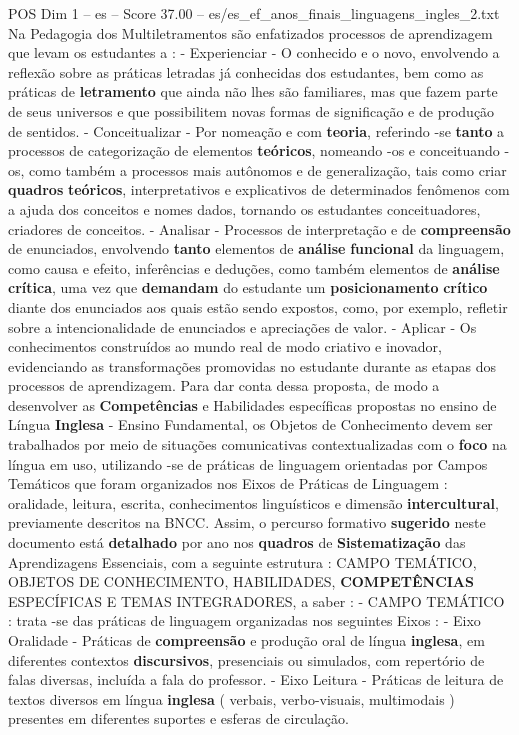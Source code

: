 \begin{textsample}{POS Dim 1 – es – Score 37.00 – es/es\_ef\_anos\_finais\_linguagens\_ingles\_2.txt}  \label{ex:f1_pos_200}
Na Pedagogia dos Multiletramentos são enfatizados processos de aprendizagem que levam os estudantes a : - Experienciar - O conhecido e o novo, envolvendo a reflexão sobre as práticas letradas já conhecidas dos estudantes, bem como as práticas de \textbf{letramento} que ainda não lhes são familiares, mas que fazem parte de seus universos e que possibilitem novas formas de significação e de produção de sentidos. - Conceitualizar - Por nomeação e com \textbf{teoria}, referindo -se \textbf{tanto} a processos de categorização de elementos \textbf{teóricos}, nomeando -os e conceituando -os, como também a processos mais autônomos e de generalização, tais como criar \textbf{quadros} \textbf{teóricos}, interpretativos e explicativos de determinados fenômenos com a ajuda dos conceitos e nomes dados, tornando os estudantes conceituadores, criadores de conceitos. - Analisar - Processos de interpretação e de \textbf{compreensão} de enunciados, envolvendo \textbf{tanto} elementos de \textbf{análise} \textbf{funcional} da linguagem, como causa e efeito, inferências e deduções, como também elementos de \textbf{análise} \textbf{crítica}, uma vez que \textbf{demandam} do estudante um \textbf{posicionamento} \textbf{crítico} diante dos enunciados aos quais estão sendo expostos, como, por exemplo, refletir sobre a intencionalidade de enunciados e apreciações de valor. - Aplicar - Os conhecimentos construídos ao mundo real de modo criativo e inovador, evidenciando as transformações promovidas no estudante durante as etapas dos processos de aprendizagem.
Para dar conta dessa proposta, de modo a desenvolver as \textbf{Competências} e Habilidades específicas propostas no ensino de Língua \textbf{Inglesa} - Ensino Fundamental, os Objetos de Conhecimento devem ser trabalhados por meio de situações comunicativas contextualizadas com o \textbf{foco} na língua em uso, utilizando -se de práticas de linguagem orientadas por Campos Temáticos que foram organizados nos Eixos de Práticas de Linguagem : oralidade, leitura, escrita, conhecimentos linguísticos e dimensão \textbf{intercultural}, previamente descritos na BNCC.
Assim, o percurso formativo \textbf{sugerido} neste documento está \textbf{detalhado} por ano nos \textbf{quadros} de \textbf{Sistematização} das Aprendizagens Essenciais, com a seguinte estrutura : CAMPO TEMÁTICO, OBJETOS DE CONHECIMENTO, HABILIDADES, \textbf{COMPETÊNCIAS} ESPECÍFICAS E TEMAS INTEGRADORES, a saber : - CAMPO TEMÁTICO : trata -se das práticas de linguagem organizadas nos seguintes Eixos : - Eixo Oralidade - Práticas de \textbf{compreensão} e produção oral de língua \textbf{inglesa}, em diferentes contextos \textbf{discursivos}, presenciais ou simulados, com repertório de falas diversas, incluída a fala do professor. - Eixo Leitura - Práticas de leitura de textos diversos em língua \textbf{inglesa} ( verbais, verbo-visuais, multimodais ) presentes em diferentes suportes e esferas de circulação.

\end{textsample}
